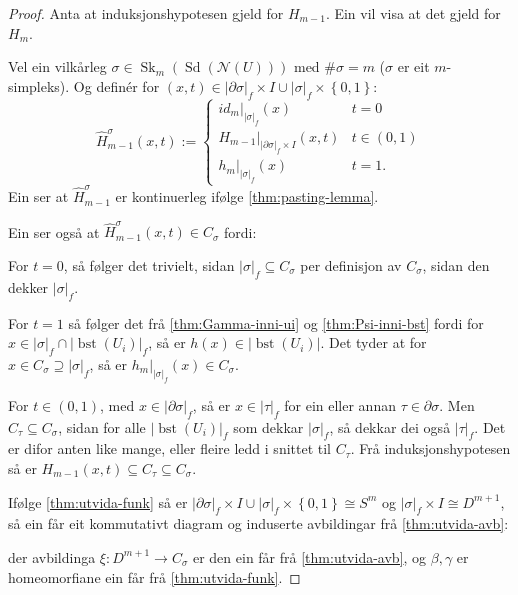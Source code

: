 \documentclass[a4paper, 12pt, norsk]{article}
\theoremstyle{plain}
\theoremstyle{definition}
\newcommand{\Nc}{\mathcal{N}}
\newcommand{\intersect}{ \mathop{\cap}\limits }
\newcommand{\union}{ \mathop{\cup}\limits }
\newcommand{\gr}[1]{ \lvert #1 \rvert } %
\newcommand{\set}[1]{ \left\{ #1 \right\} } %
\DeclareMathOperator{\Sd}{Sd} %
\DeclareMathOperator{\bst}{bst} %
\DeclareMathOperator{\Sk}{Sk} %
\begin{document}
\begin{proof}
	Anta at induksjonshypotesen gjeld for \( H_{m-1} \). Ein vil visa at det gjeld for \( H_m \).

	Vel ein vilkårleg \( \sigma \in \Sk_m(\Sd(\Nc(U))) \) med \( \#\sigma = m \) (\( \sigma \) er eit \( m \)-simpleks). Og definér for \( (x, t) \in \gr{\partial\sigma}_f \times I \union \gr{\sigma}_f \times \set{0, 1} \):
	\[
		\hat{H}_{m-1}^\sigma (x,t) := 
		\begin{cases}
			id_m|_{\gr{\sigma}_f}(x) & t=0 \\
			H_{m-1}|_{\gr{\partial\sigma}_f \times I}(x,t) & t \in (0, 1) \\
			h_m|_{\gr{\sigma}_f}(x) & t=1.
		\end{cases}
	\]
	Ein ser at \( \hat{H}_{m-1}^\sigma \) er kontinuerleg ifølge \autoref{thm:pasting-lemma}.
	
	Ein ser også at \( \hat{H}_{m-1}^\sigma (x,t) \in C_\sigma \) fordi: 
	
	For \( t = 0 \), så følger det trivielt, sidan \( \gr{\sigma}_f \subseteq C_\sigma \) per definisjon av \( C_\sigma \), sidan den dekker \( \gr{\sigma}_f \).
	
	For \( t = 1 \) så følger det frå \autoref{thm:Gamma-inni-ui} og \autoref{thm:Psi-inni-bst} fordi for \( x \in \gr{\sigma}_f \intersect \gr{\bst(U_i)}_f \), så er \( h(x) \in \gr{\bst(U_i)} \). Det tyder at for \( x \in C_\sigma \supseteq \gr{\sigma}_f \), så er \( h_m|_{\gr{\sigma}_f}(x) \in C_\sigma \). 
	
	For \( t \in (0, 1) \), med \( x \in \gr{\partial\sigma}_f \), så er \( x \in \gr{\tau}_f \) for ein eller annan \( \tau \in \partial\sigma \). Men \( C_\tau \subseteq C_\sigma \), sidan for alle \( \gr{\bst(U_i)}_f \) som dekkar \( \gr{\sigma}_f \), så dekkar dei også \( \gr{\tau}_f \). Det er difor anten like mange, eller fleire ledd i snittet til \( C_\tau \). Frå induksjonshypotesen så er \( H_{m-1}(x, t) \subseteq C_{\tau} \subseteq C_\sigma \).

	Ifølge \autoref{thm:utvida-funk} så er \( \gr{\partial\sigma}_f \times I \union \gr{\sigma}_f \times \set{0, 1} \cong S^{m} \) og \( \gr{\sigma}_f \times I \cong D^{m+1} \), så ein får eit kommutativt diagram og induserte avbildingar frå \autoref{thm:utvida-avb}:

	\begin{center}
	\end{center}
	der avbildinga \( \xi: D^{m+1} \to C_\sigma \) er den ein får frå \autoref{thm:utvida-avb}, og \( \beta, \gamma \) er homeomorfiane ein får frå \autoref{thm:utvida-funk}.


\end{proof}
\end{document}
